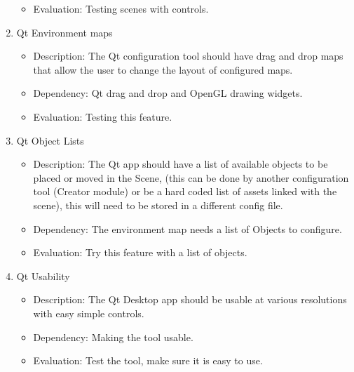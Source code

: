 \documentclass[a4paper,10pt]{article}
\begin{document}
\begin{enumerate}
\begin{itemize}
		\item Evaluation:  Testing scenes with controls.
		\end{itemize}
		\item Qt Environment maps
		\begin{itemize}
		\item Description: The Qt configuration tool should have drag and drop maps that allow the user to change the layout of configured maps.
		\item Dependency:  Qt drag and drop and OpenGL drawing widgets. 
		\item Evaluation:  Testing this feature.
		\end{itemize}
		\item Qt Object Lists
		\begin{itemize}
		\item Description: The Qt app should have a list of available objects to be placed or moved in the Scene, (this can be done by another configuration tool 
		(Creator module) or be a hard coded list of assets linked with the scene), this will need to be stored in a different config file. 
		\item Dependency:  The environment map needs a list of Objects to configure. 
		\item Evaluation:  Try this feature with a list of objects.
		\end{itemize}

		\item Qt Usability
		\begin{itemize}
		\item Description: The Qt Desktop app should be usable at various resolutions with easy simple controls. 
		\item Dependency:  Making the tool usable.
		\item Evaluation:  Test the tool, make sure it is easy to use.
		\end{itemize}
		

\end{enumerate}
\end{document}
